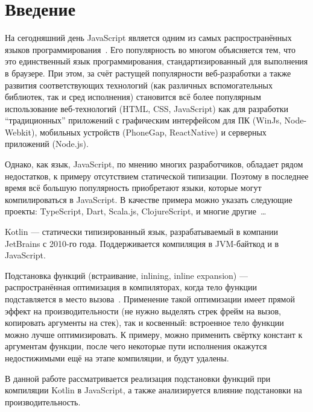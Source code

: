 \section*{Введение}

На сегодняшний день JavaScript является одним из самых
распространённых языков программирования~\cite{TIOBE,LANGPOP}.
Его популярность во многом объясняется тем, что это единственный
язык программирования, стандартизированный для выполнения в браузере.
При этом, за счёт растущей популярности веб-разработки а также
развития соответствующих технологий
(как различных вспомогательных библиотек,
так и сред исполнения) становится всё более популярным
использование веб-технологий (HTML, CSS, JavaScript)
как для разработки ``традиционных'' приложений с
графическим интерфейсом для ПК (WinJs, Node-Webkit),
мобильных устройств (PhoneGap, ReactNative) и серверных приложений
(Node.js).

Однако, как язык, JavaScript, по мнению многих разработчиков,
обладает рядом недостатков,
к примеру отсутствием статической типизации.
Поэтому в последнее время всё большую популярность
приобретают языки, которые могут компилироваться в JavaScript.
В качестве примера можно указать следующие проекты: TypeScript,
Dart, Scala.js, ClojureScript, и многие другие~\cite{TARGET_JS}\ldots

Kotlin --- статически типизированный язык, разрабатываемый
в компании JetBrains с 2010-го года. Поддерживается компиляция
в JVM-байткод и в JavaScript.

Подстановка функций (встраивание, inlining, inline expansion) --- распространённая
оптимизация в компиляторах, когда тело функции подставляется
в место вызова~\cite{WIKI_INLINE}. Применение такой оптимизации
имеет прямой эффект на производительности (не нужно выделять стрек
фрейм на вызов, копировать аргументы на стек), так и косвенный:
встроенное тело функции можно лучше оптимизировать.
К примеру, можно применить свёртку констант к аргументам функции,
после чего некоторые пути исполнения окажутся недостижимыми
ещё на этапе компиляции, и будут удалены.

В данной работе рассматривается реализация подстановки функций
при компиляции Kotlin в JavaScript, а также анализируется
влияние подстановки на производительность.
